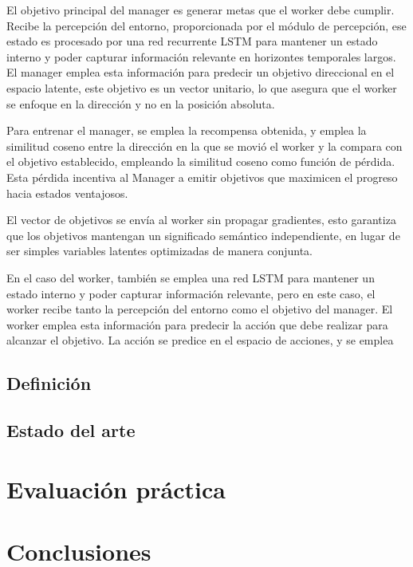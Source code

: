 \documentclass[letterpaper]{article} %
\begin{document}
El objetivo principal del manager es generar metas que el worker debe cumplir. Recibe la percepción
del entorno, proporcionada por el módulo de percepción, ese estado es procesado por una red recurrente LSTM
para mantener un estado interno y poder capturar información relevante en horizontes temporales largos.
El manager emplea esta información para predecir un objetivo direccional en el espacio latente, este objetivo
es un vector unitario, lo que asegura que el worker se enfoque en la dirección y no en la posición absoluta.

Para entrenar el manager, se emplea la recompensa obtenida, y emplea la similitud coseno entre la dirección en la que 
se movió el worker y la compara con el objetivo establecido, empleando la similitud coseno como función de pérdida.
Esta pérdida incentiva al Manager a emitir objetivos que maximicen el progreso hacia estados ventajosos.

El vector de objetivos se envía al worker sin propagar gradientes, esto garantiza que los objetivos 
mantengan un significado semántico independiente, en lugar de ser simples variables latentes optimizadas de manera conjunta.

En el caso del worker, también se emplea una red LSTM para mantener un estado interno y poder capturar información relevante,
pero en este caso, el worker recibe tanto la percepción del entorno como el objetivo del manager. El worker emplea esta información
para predecir la acción que debe realizar para alcanzar el objetivo. La acción se predice en el espacio de acciones, y se emplea


\subsection{Definición}

\subsection{Estado del arte}

\section{Evaluación práctica}

\section{Conclusiones}






\end{document}
